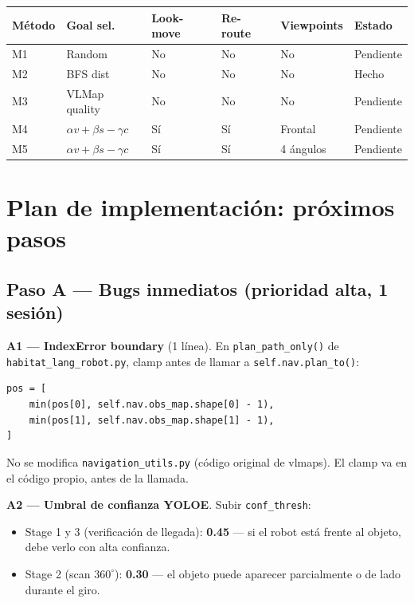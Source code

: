 \documentclass[11pt,a4paper]{article}
\begin{document}
\begin{center}
\begin{tabular}{llllll}
\toprule
\textbf{Método} & \textbf{Goal sel.} & \textbf{Look-move} & \textbf{Re-route} &
\textbf{Viewpoints} & \textbf{Estado} \\
\midrule
M1 & Random & No & No & No & \textcolor{pendingcol}{Pendiente} \\
M2 & BFS dist & No & No & No & \textcolor{done}{Hecho} \\
M3 & VLMap quality & No & No & No & \textcolor{pendingcol}{Pendiente} \\
M4 & $\alpha v + \beta s - \gamma c$ & Sí & Sí & Frontal & \textcolor{pendingcol}{Pendiente} \\
M5 & $\alpha v + \beta s - \gamma c$ & Sí & Sí & 4 ángulos & \textcolor{pendingcol}{Pendiente} \\
\bottomrule
\end{tabular}
\end{center}

\section{Plan de implementación: próximos pasos}

\subsection{Paso A --- Bugs inmediatos (prioridad alta, 1 sesión)}

\textbf{A1 --- IndexError boundary} (1 línea).
En \texttt{plan\_path\_only()} de \texttt{habitat\_lang\_robot.py}, clamp antes de llamar
a \texttt{self.nav.plan\_to()}:

\begin{verbatim}
pos = [
    min(pos[0], self.nav.obs_map.shape[0] - 1),
    min(pos[1], self.nav.obs_map.shape[1] - 1),
]
\end{verbatim}

No se modifica \texttt{navigation\_utils.py} (código original de vlmaps). El clamp va en
el código propio, antes de la llamada.

\textbf{A2 --- Umbral de confianza YOLOE}.
Subir \texttt{conf\_thresh}:
\begin{itemize}
  \item Stage 1 y 3 (verificación de llegada): \textbf{0.45} --- si el robot está frente
        al objeto, debe verlo con alta confianza.
  \item Stage 2 (scan $360^\circ$): \textbf{0.30} --- el objeto puede aparecer parcialmente o
        de lado durante el giro.
\end{itemize}
\end{document}
